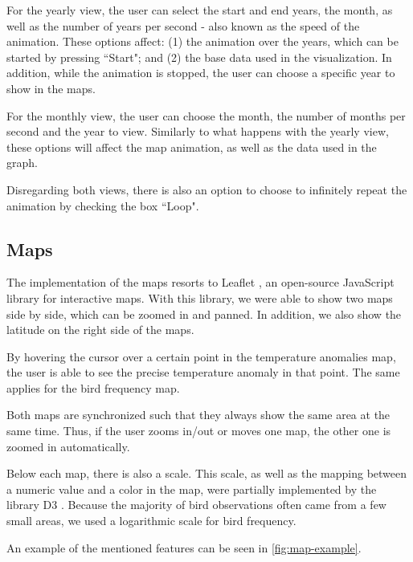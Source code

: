 \documentclass[journal]{vgtc}                %
\begin{document}
For the yearly view, the user can select the start and end years, the month, as well as the number of years per second - also known as the speed of the animation. These options affect: (1) the animation over the years, which can be started by pressing ``Start"; and (2) the base data used in the visualization. In addition, while the animation is stopped, the user can choose a specific year to show in the maps.

For the monthly view, the user can choose the month, the number of months per second and the year to view. Similarly to what happens with the yearly view, these options will affect the map animation, as well as the data used in the graph.

Disregarding both views, there is also an option to choose to infinitely repeat the animation by checking the box ``Loop".

\subsection{Maps}

The implementation of the maps resorts to Leaflet \cite{leaflet}, an open-source JavaScript library for interactive maps. With this library, we were able to show two maps side by side, which can be zoomed in and panned. In addition, we also show the latitude on the right side of the maps.

By hovering the cursor over a certain point in the temperature anomalies map, the user is able to see the precise temperature anomaly in that point. The same applies for the bird frequency map.

Both maps are synchronized such that they always show the same area at the same time. Thus, if the user zooms in/out or moves one map, the other one is zoomed in automatically.

Below each map, there is also a scale. This scale, as well as the mapping between a numeric value and a color in the map, were partially implemented by the library D3 \cite{bostock2011d3}. Because the majority of bird observations often came from a few small areas, we used a logarithmic scale for bird frequency.

An example of the mentioned features can be seen in \autoref{fig:map-example}.
\end{document}

